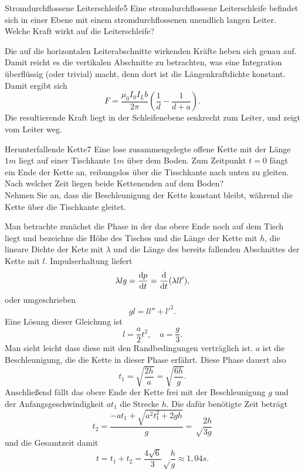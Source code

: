 \begin{problem}{Stromdurchflossene Leiterschleife}{5}
Eine stromdurchflossene Leiterschleife befindet sich in einer Ebene mit einem stromdurchflossenen
unendlich langen Leiter. Welche Kraft wirkt auf die Leiterschleife?
\begin{solution}
Die auf die horizontalen Leiterabschnitte wirkenden Kräfte heben sich genau auf. Damit reicht es die vertikalen Abschnitte zu betrachten, was eine Integration überflüssig (oder trivial) macht, denn dort ist die Längenkraftdichte konstant. Damit ergibt sich
\[
F=\frac{\mu_0 I_0 I_L b}{2\pi} \left( \frac{1}{d}-\frac{1}{d+a} \right).
\]
Die resultierende Kraft liegt in der Schleifenebene senkrecht zum Leiter, und zeigt vom Leiter weg.
\end{solution}
\end{problem}


\begin{problem}{Herunterfallende Kette}{7}
Eine lose zusammengelegte offene Kette mit der Länge $1\unit{m}$ liegt auf einer Tischkante $1\unit{m}$ über dem Boden. Zum Zeitpunkt $t = 0$ fängt ein Ende der Kette an, reibungslos über die Tisschkante nach unten zu gleiten.\\
Nach welcher Zeit liegen beide Kettenenden auf dem Boden?\\
Nehmen Sie an, dass die Beschleunigung der Kette konstant bleibt, während die Kette über die Tischkante gleitet.
\begin{solution}
Man betrachte zunächst die Phase in der das obere Ende noch auf dem Tisch liegt und bezeichne die Höhe des Tisches und die Länge der Kette mit $h$, die lineare Dichte der Kete mit $\lambda$ und die Länge des bereits fallenden Abschnittes der Kette mit $l$. Impulserhaltung liefert
\[
\lambda l g = \frac{\mathrm{d} p}{\mathrm{d} t}  = \frac{\mathrm{d}}{\mathrm{d} t} (\lambda l l'),
\]
oder umgeschrieben
\[
g l = l l'' + l'^2.
\]
Eine Lösung dieser Gleichung ist
\[
l = \frac a2 t^2, \quad a = \frac g3.
\]
Man sieht leicht dass diese mit den Randbedingungen verträglich ist. $a$ ist die Beschleunigung, die die Kette in dieser Phase erfährt. Diese Phase dauert also
\[
t_1 = \sqrt{\frac{2 h}{a}} = \sqrt{\frac{6 h}{g}}.
\]
Anschließend fällt das obere Ende der Kette frei mit der Beschleunigung $g$ und der Anfangsgeschwindigkeit $a t_1$ die Strecke $h$. Die dafür benötigte Zeit beträgt
\[
t_2 = \frac{-at_1 + \sqrt{a^2 t_1^2 + 2 g h}}{g} = \sqrt\frac{2 h}{3 g}
\]
und die Gesamtzeit damit
\[
t = t_1 + t_2 = \frac{4 \sqrt 6}{3} \sqrt\frac{h}{g} \approx 1,04\unit{s}.
\]
\end{solution}
\end{problem}

